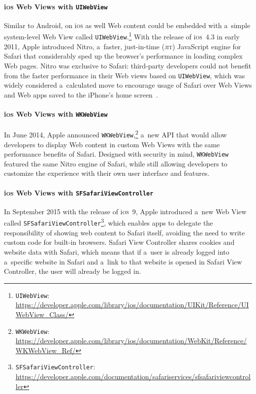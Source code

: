 \documentclass[sigconf]{acmart}
\begin{document}
\paragraph{i\textsc{os} Web Views with \texttt{UIWebView}}

Similar to Android, on i\textsc{os} as well Web content could be embedded with
a~simple system-level Web View called \texttt{UIWebView}.\footnote{\texttt{UIWebView}:
\url{https://developer.apple.com/library/ios/documentation/UIKit/Reference/UIWebView_Class/}}
With the release of i\textsc{os}~4.3 in early 2011, Apple introduced Nitro,
a~faster, just-in-time (\textsc{jit}) JavaScript engine for Safari
that considerably sped up the browser's performance in loading complex Web pages.
Nitro was exclusive to Safari: third-party developers could not benefit
from the faster performance in their Web views based on \texttt{UIWebView},
which was widely considered a~calculated move to encourage usage of Safari
over Web Views and Web apps saved to the iPhone's home screen~\cite{viticci2015safari}.

\paragraph{i\textsc{os} Web Views with \texttt{WKWebView}}

In June 2014, Apple announced \texttt{WKWebView},\footnote{\texttt{WKWebView}:
\url{https://developer.apple.com/library/ios/documentation/WebKit/Reference/WKWebView_Ref/}}
a~new API that would allow developers
to display Web content in custom Web Views with the same performance benefits of Safari.
Designed with security in mind, \texttt{WKWebView} featured the same Nitro engine of Safari,
while still allowing developers to customize the experience
with their own user interface and features.

\paragraph{i\textsc{os} Web Views with \texttt{SFSafariViewController}}

In September 2015 with the release of i\textsc{os}~9, Apple introduced a~new Web View called
\texttt{SFSafariViewController}\footnote{\texttt{SFSafariViewController}:
\url{https://developer.apple.com/documentation/safariservices/sfsafariviewcontroller}},
which enables apps to delegate the responsibility of showing web content to Safari itself,
avoiding the need to write custom code for built-in browsers.
Safari View Controller shares cookies and website data with Safari,
which means that if a~user is already logged into a~specific website in Safari
and a~link to that website is opened in Safari View Controller,
the user will already be logged in.
\end{document}
